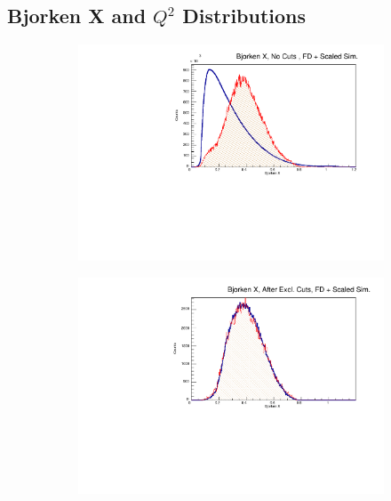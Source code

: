     \subsection{Bjorken X and $Q^2$ Distributions}

        \begin{figure}[!htb]
            \centering
            \begin{subfigure}{.45\textwidth}
                \centering
                \includegraphics[width=1\textwidth]{figures/Simulation/kinematics_advanced/hist_xb_nocut_fd_Double.pdf}
            \end{subfigure}%
            \begin{subfigure}{.45\textwidth}
                \centering
                \includegraphics[width=1\textwidth]{figures/Simulation/kinematics_advanced/hist_xb_excut_fd_Double.pdf}

\end{subfigure}
\end{figure}
